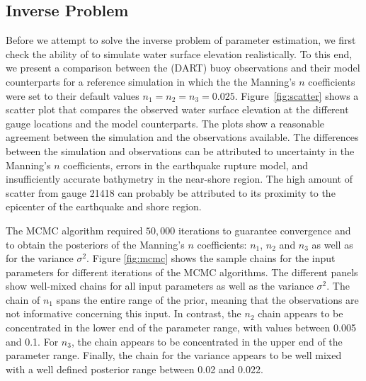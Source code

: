 \subsection{Inverse Problem} 
\label{sec:inverse}

Before we attempt to solve the inverse problem of parameter estimation, 
we first check the ability of \geoclaw to simulate water surface elevation
realistically. To this end, we present a comparison between the 
(DART) buoy observations and their \geoclaw model counterparts
for a reference simulation in which the the Manning's $n$ coefficients were set to their default values $n_1=n_2=n_3=0.025$. Figure~\ref{fig:scatter} 
shows a scatter plot that compares the observed 
water surface elevation at the different gauge locations and the \geoclaw model counterparts. The plots show a reasonable agreement between the simulation and the observations available.  The differences between the simulation and observations can be attributed to uncertainty in the Manning's $n$ coefficients, errors in the earthquake rupture model, and insufficiently accurate bathymetry in the near-shore region.  The high amount of scatter from gauge 21418 can probably be attributed to its proximity to the epicenter of the earthquake and shore region.


The MCMC algorithm required $50,000$ iterations to guarantee convergence
and to obtain the posteriors of the Manning's $n$ coefficients: 
$n_1$, $n_2$ and $n_3$ as well as for the variance $\sigma^2$. Figure \ref{fig:mcmc} 
shows the sample chains for the input parameters for different iterations of the MCMC algorithms. 
The different panels show well-mixed chains for all input parameters as well as the variance $\sigma^2$.
The chain of  $n_{1}$ spans the entire range of the prior, meaning that the observations are not informative 
concerning this input.  In contrast, the $n_{2}$ chain appears to be concentrated in the 
lower end of the parameter range, with values between 0.005 and 0.1. 
For $n_{3}$, the chain appears to be concentrated in the 
upper end of the parameter range. Finally, the chain for the variance 
appears to be well mixed with a well defined posterior range between 0.02 and 0.022.  

